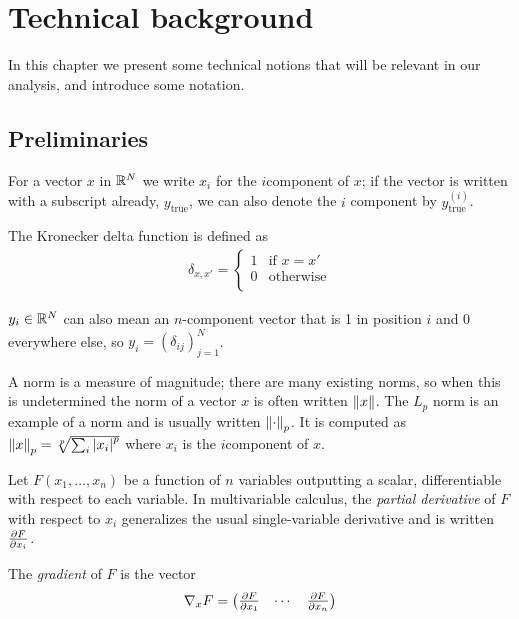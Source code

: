 \documentclass[../main.tex]{subfiles}
\begin{document}
\chapter{Technical background}
\label{ch:background}

In this chapter we present some technical notions that will be relevant in our analysis, and introduce some notation.

\section{Preliminaries}

For a vector $x$ in $\R^N$ we write $x_i$ for the $i$\nth component of $x$; if the vector is written with a subscript already, \eg{} $y_\text{true}$, we can also denote the $i$\nth{} component by $y^{(i)}_\text{true}$.

The Kronecker delta function is defined as
\begin{align*}
\delta_{x, x'} = \begin{cases}
    1 & \text{if } x = x' \\
    0 & \text{otherwise} \\
\end{cases}
\end{align*}

$y_i \in \R^N$ can also mean an $n$-component vector that is 1 in position $i$ and 0 everywhere else, so $y_i = (\delta_{ij})_{j=1}^N$.

A norm is a measure of magnitude; there are many existing norms, so when this is undetermined the norm of a vector $x$ is often written $\norm{x}$.
The $L_p$ norm is an example of a norm and is usually written $\norm{\cdot}_p$.
It is computed as $\norm{x}_p = \sqrt[p]{\sum_i \abs{x_i}^p}$ where $x_i$ is the $i$\nth component of $x$.

Let $F(x_1, \ldots, x_n)$ be a function of $n$ variables outputting a scalar, differentiable with respect to each variable.
In multivariable calculus, the \emph{partial derivative} of $F$ with respect to $x_i$ generalizes the usual single-variable derivative
and is written $\del{F}{x_i}$.

The \emph{gradient} of $F$ is the vector
\begin{align*}
    \grad{F}{x} =  \begin{pmatrix}
        \del{F}{x_1} & \cdots  & \del{F}{x_n}
    \end{pmatrix}
\end{align*}
\end{document}
